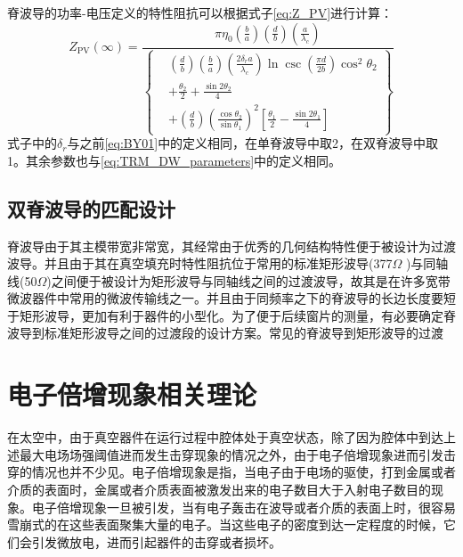 \documentclass[master]{thesis-uestc}
\begin{document}
脊波导的功率-电压定义的特性阻抗可以根据式子\ref{eq:Z_PV}进行计算：
\begin{equation}\label{eq:Z_PV}
    Z_{\mathrm{PV}}(\infty) = \frac{\pi \eta_0 \left( \frac{b}{a} \right) \left( \frac{d}{b} \right) \left( \frac{a}{\lambda_c} \right)}{
        \left\{ 
            \begin{aligned}
                & \left( \frac{d}{b} \right) \left( \frac{b}{a} \right) \left( \frac{2 \delta_r a}{\lambda_c} \right) \ln \csc \left( \frac{\pi d}{2b} \right) \cos^2 \theta_2 \\
                & + \frac{\theta_2}{2} + \frac{\sin 2\theta_2}{4} \\
                & + \left( \frac{d}{b} \right) \left( \frac{\cos \theta_2}{\sin \theta_1} \right)^2 \left[ \frac{\theta_1}{2} - \frac{\sin 2\theta_1}{4} \right]
            \end{aligned}
        \right\}
    }
\end{equation}
式子中的$\delta_{r}$与之前\ref{eq:BY01}中的定义相同，在单脊波导中取2，在双脊波导中取1。其余参数也与\ref{eq:TRM_DW_parameters}中的定义相同。
\subsection{双脊波导的匹配设计}
脊波导由于其主模带宽非常宽，其经常由于优秀的几何结构特性便于被设计为过渡波导。并且由于其在真空填充时特性阻抗位于常用的标准矩形波导(377$\Omega$ )与同轴线(50$\Omega$)之间便于被设计为矩形波导与同轴线之间的过渡波导，故其是在许多宽带微波器件中常用的微波传输线之一。并且由于同频率之下的脊波导的长边长度要短于矩形波导，更加有利于器件的小型化。为了便于后续窗片的测量，有必要确定脊波导到标准矩形波导之间的过渡段的设计方案。常见的脊波导到矩形波导的过渡

\section{电子倍增现象相关理论}
在太空中，由于真空器件在运行过程中腔体处于真空状态，除了因为腔体中到达上述最大电场场强阈值进而发生击穿现象的情况之外，由于电子倍增现象进而引发击穿的情况也并不少见。电子倍增现象是指，当电子由于电场的驱使，打到金属或者介质的表面时，金属或者介质表面被激发出来的电子数目大于入射电子数目的现象。电子倍增现象一旦被引发，当有电子轰击在波导或者介质的表面上时，很容易雪崩式的在这些表面聚集大量的电子。当这些电子的密度到达一定程度的时候，它们会引发微放电，进而引起器件的击穿或者损坏。
\end{document}
